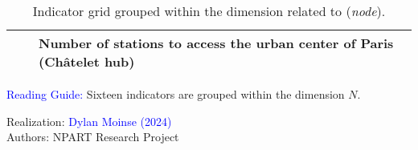 \begin{table}[h!]
{\begin{tabular}{p{}p{}p{}}
& \small{\multirow{1.5}{*}{\(N_{16}\)}} & \small{Number of stations to access the urban center of Paris (Châtelet hub)}\\
        \hline
        \end{tabular}}
    \caption{Indicator grid grouped within the dimension related to  (\textsl{node}).}
    \label{table-chap6:indicateurs-node}
        \vspace{5pt}
        \begin{flushleft}\scriptsize{
        \textcolor{blue}{Reading Guide:} Sixteen indicators are grouped within the dimension \(N\). 
        }\end{flushleft}
        \begin{flushright}\scriptsize{
        Realization: \textcolor{blue}{Dylan Moinse (2024)}
        \\
        Authors: \acrshort{NPART} Research Project
        }\end{flushright}
        \end{table}